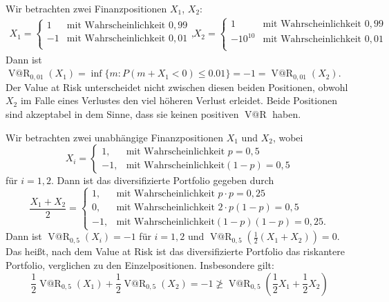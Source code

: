 \documentclass[a4paper,twoside,DIV15,BCOR12mm]{scrbook}
\makeatletter
\DeclareMathOperator{\VatR}{V@R}
\makeatother
\begin{document}
\begin{beispiel}
Wir betrachten zwei Finanzpositionen $X_1$, $X_2$:
\begin{align*}
X_1 =
\begin{cases}
1& \text{mit Wahrscheinlichkeit } 0,99\\
-1& \text{mit Wahrscheinlichkeit } 0,01\\
\end{cases},
&&
X_2 =
\begin{cases}
1& \text{mit Wahrscheinlichkeit } 0,99\\
-10^{10} & \text{mit Wahrscheinlichkeit } 0,01\\
\end{cases}
\end{align*}
Dann ist $\VatR_{0,01}(X_1) = \inf\{m: P(m + X_1<0) \le 0.01\} = -1 = \VatR_{0,01}(X_2)$. Der Value at Risk unterscheidet nicht zwischen diesen beiden Positionen, obwohl $X_2$ im Falle eines Verlustes den viel höheren Verlust erleidet. Beide Positionen sind akzeptabel in dem Sinne, dass sie keinen positiven $\VatR$ haben.
\end{beispiel}


\begin{beispiel}
Wir betrachten zwei unabhängige Finanzpositionen $X_1$ und $X_2$, wobei 
\[
X_i=
\begin{cases}
1,& \text{mit Wahrscheinlichkeit } p=0,5\\
-1,& \text{mit Wahrscheinlichkeit} (1-p)=0,5
\end{cases}
\]
für $i=1,2$.
Dann ist das diversifizierte Portfolio gegeben durch 
\[
\frac {X_1+X_2}2 = 
\begin{cases}
1,& \text{mit Wahrscheinlichkeit } p\cdot p=0,25\\
0,& \text{mit Wahrscheinlichkeit } 2\cdot p(1-p) = 0,5\\
-1,& \text{mit Wahrscheinlichkeit} (1-p)(1-p)=0,25.
\end{cases}
\]
Dann ist $\VatR_{0,5}(X_i) = -1$ für $i=1,2$ und $\VatR_{0,5}(\frac12(X_1+X_2))=0$. Das heißt, nach dem Value at Risk ist das diversifizierte Portfolio das riskantere Portfolio, verglichen zu den Einzelpositionen. Insbesondere gilt:
\[
\frac12\VatR_{0,5}(X_1) + \frac 12\VatR_{0,5}(X_2) = -1 \not\ge 
\VatR_{0,5}(\frac 12 X_1 + \frac 12 X_2)
\]
\end{beispiel}
\end{document}
